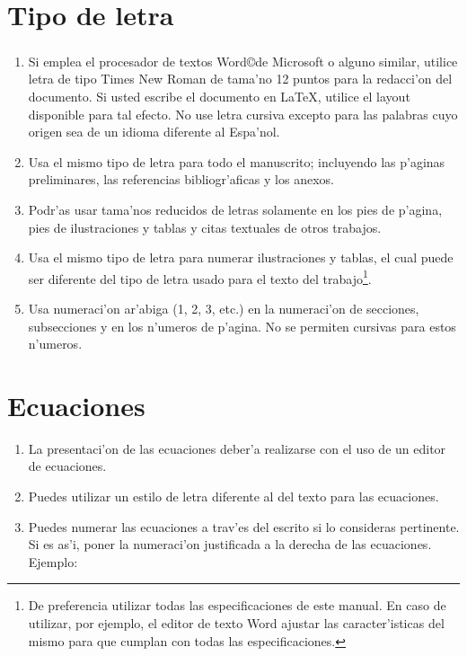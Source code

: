 \section{Tipo de letra}
\noindent
\begin{enumerate}
	\item Si emplea el procesador de textos Word\copyright  de Microsoft\textsuperscript{\texttrademark} o alguno similar, utilice letra de tipo Times New Roman de tama'no 12 puntos para la redacci'on del documento. Si usted escribe el documento en \LaTeX, utilice el layout disponible para tal efecto. No use letra cursiva excepto para las palabras cuyo origen sea de un idioma diferente al Espa'nol.
	\item Usa el mismo tipo de letra para todo el manuscrito; incluyendo las p'aginas preliminares, las referencias bibliogr'aficas y los anexos.
	\item Podr'as usar tama'nos reducidos de letras solamente en los pies de p'agina, pies de ilustraciones y tablas y citas textuales de otros trabajos.
	\item Usa el mismo tipo de letra para numerar ilustraciones y tablas, el cual puede ser diferente del tipo de letra usado para el texto del trabajo\footnote{De preferencia utilizar todas las especificaciones de este manual. En caso de utilizar, por ejemplo, el editor de texto Word ajustar las caracter'isticas del mismo para que cumplan con todas las especificaciones.\label{footnote}}.
	\item Usa numeraci'on ar'abiga (1, 2, 3, etc.) en la numeraci'on de secciones, subsecciones y en los n'umeros de p'agina. No se permiten cursivas para estos n'umeros.
\end{enumerate}

\section{Ecuaciones}
\noindent
\begin{enumerate}
	\item La presentaci'on de las ecuaciones deber'a realizarse con el uso de un editor de ecuaciones.
	\item Puedes utilizar un estilo de letra diferente al del texto para las ecuaciones.
	\item Puedes numerar las ecuaciones a trav'es del escrito si lo consideras pertinente. Si es as'i, poner la numeraci'on justificada a la derecha de las ecuaciones. Ejemplo:
\end{enumerate}

